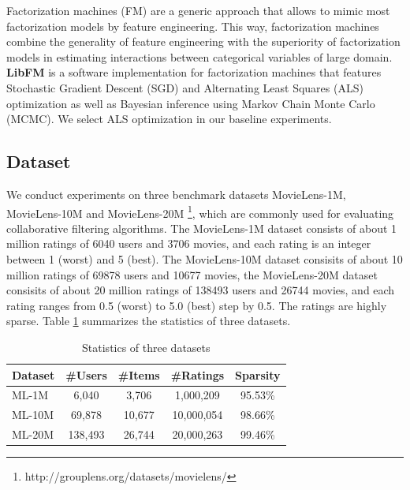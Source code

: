 \documentclass{sig-alternate-05-2015}
\begin{document}
Factorization machines (FM) are a generic approach that
allows to mimic most factorization models by feature engineering.
This way, factorization machines combine the generality of
feature engineering with the superiority of factorization models
in estimating interactions between categorical variables of large domain.
\textbf{LibFM} \cite{rendle2012factorization} is a software implementation
for factorization machines that features
Stochastic Gradient Descent (SGD) and
Alternating Least Squares (ALS) optimization as well as
Bayesian inference using Markov Chain Monte Carlo (MCMC).
We select ALS optimization in our baseline experiments.

\subsection{Dataset}
We conduct experiments on three benchmark datasets MovieLens-1M, MovieLens-10M and MovieLens-20M
\footnote{http://grouplens.org/datasets/movielens/},
which are commonly used for evaluating collaborative filtering algorithms.
The MovieLens-1M dataset consists of about 1 million ratings of 6040 users and 3706 movies,
and each rating is an integer between 1 (worst) and 5 (best).
The MovieLens-10M dataset consisits of about 10 million ratings of 69878 users and 10677 movies,
the MovieLens-20M dataset consisits of about 20 million ratings of 138493 users and 26744 movies,
and each rating ranges from 0.5 (worst) to 5.0 (best) step by 0.5.
The ratings are highly sparse.
Table \ref{tab:statistics} summarizes the statistics of three datasets.

\begin{table}[htpb]
	\centering
	\caption{Statistics of three datasets}
	\label{tab:statistics}
	\begin{tabular}{|l|c|c|c|c|}
		\hline
		\textbf{Dataset} & \textbf{\#Users} & \textbf{\#Items} & \textbf{\#Ratings} & \textbf{Sparsity} \\
		\hline
		ML-1M  & 6,040   & 3,706  & 1,000,209  & 95.53\% \\
		ML-10M & 69,878  & 10,677 & 10,000,054 & 98.66\% \\
		ML-20M & 138,493 & 26,744 & 20,000,263 & 99.46\% \\
		\hline
	\end{tabular}
\end{table}
\end{document}
